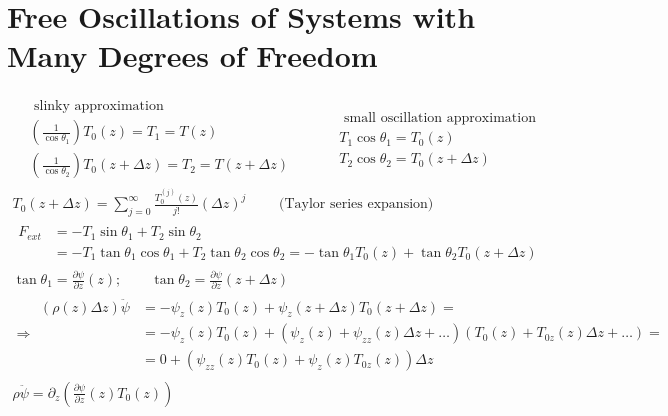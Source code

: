 \documentclass[twoside,10pt]{amsart}
\newcommand{\problemhead}[1]
  {\smallskip
   \noindent{\large\bf Problem #1.}
   \smallskip}
\begin{document}
\section{ Free Oscillations of Systems with Many Degrees of Freedom }

\problemhead{2.10}
\[
\begin{gathered}
  \begin{aligned} 
    & \text{ slinky approximation } \\
    & \left( \frac{1}{ \cos{\theta_1} } \right) T_0(z) = T_1 = T(z) \\
    &  \left( \frac{1}{\cos{\theta_2} } \right) T_0(z+ \Delta z ) = T_2 = T(z+\Delta z) 
\end{aligned} \quad \quad 
\begin{aligned}
  & \text{ small oscillation approximation } \\
  & T_1 \cos{\theta_1}  = T_0(z) \\
  &  T_2 \cos{\theta_2} = T_0(z+ \Delta z ) 
\end{aligned} \\
T_0(z+ \Delta z) = \sum_{j=0}^{\infty} \frac{T_0^{(j)}(z) }{ j! } (\Delta z)^j \quad \quad \text{ (Taylor series expansion) } \\
\begin{aligned}
  F_{ext} & = - T_1 \sin{\theta_1} + T_2 \sin{\theta_2} \\
  & = -T_1 \tan{\theta_1} \cos{\theta_1} + T_2 \tan{\theta_2} \cos{\theta_2} = -\tan{\theta_1} T_0(z) + \tan{\theta_2} T_0(z+ \Delta z) 
\end{aligned} \\
\tan{ \theta_1} = \frac{ \partial \psi}{ \partial z } (z) ; \quad \quad \tan{ \theta_2} = \frac{ \partial \psi}{ \partial z}(z+ \Delta z) \\
\Longrightarrow \begin{aligned}
  (\rho(z) \Delta z )\ddot{\psi} & = - \psi_z(z) T_0 (z) + \psi_z(z+ \Delta z) T_0 (z + \Delta z) = \\
  & = - \psi_z(z) T_0(z) + ( \psi_z(z) + \psi_{zz}(z) \Delta z + \dots ) (T_0(z) + T_{0z}(z) \Delta z + \dots ) = \\
  & = 0 + (\psi_{zz}(z) T_0(z) + \psi_z(z) T_{0z}(z) ) \Delta z
\end{aligned} \\
\rho \ddot{\psi} = \partial_z (\frac{\partial \psi}{ \partial z }(z) T_0(z) )
\end{gathered}
\]
\end{document}
